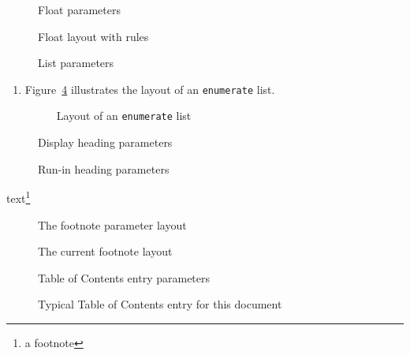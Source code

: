 \documentclass{article}
\begin{document}
\begin{figure}
\floatdiagram
\caption{Float parameters}\label{fig:flp}
\end{figure}

\begin{figure}
\currentfloat
\tryintextsep{\intextsep}
\trytopfigrule{0.5pt}
\trybotfigrule{1pt}
\floatdesign
\caption{Float layout with rules}\label{fig:fludf}
\end{figure}

\begin{figure}
\listdiagram
\caption{List parameters} \label{fig:lstp}
\end{figure}

\begin{enumerate}
\item Figure~\ref{fig:lstenum} illustrates the layout of an
\texttt{enumerate} list.
\currentlist
\begin{figure}
\listdesign
\caption{Layout of an \texttt{enumerate} list} \label{fig:lstenum}
\end{figure}
\end{enumerate}

\begin{figure}
\headingdiagram{ }
\caption{Display heading parameters}\label{fig:hdp}
\end{figure}
\begin{figure}
\runinheadtrue
\headingdiagram{ }
\caption{Run-in heading parameters}\label{fig:hrp}
\end{figure}

text\footnote{a footnote}

\begin{figure}
\setlabelfont{\huge\itshape}
\footnotediagram
\caption{The footnote parameter layout} \label{fig:fp}
\end{figure}

\begin{figure}
\currentfootnote
{}
\footnotedesign
\caption{The current footnote layout}\label{fig:ftry}
\end{figure}

\begin{figure}
\tocdiagram
\caption{Table of Contents entry parameters}\label{fig:tocp}
\end{figure}

\begin{figure}
\currenttoc
\tocdesign
\caption{Typical Table of Contents entry for this document} \label{fig:thistoc}
\end{figure}


\end{document}
